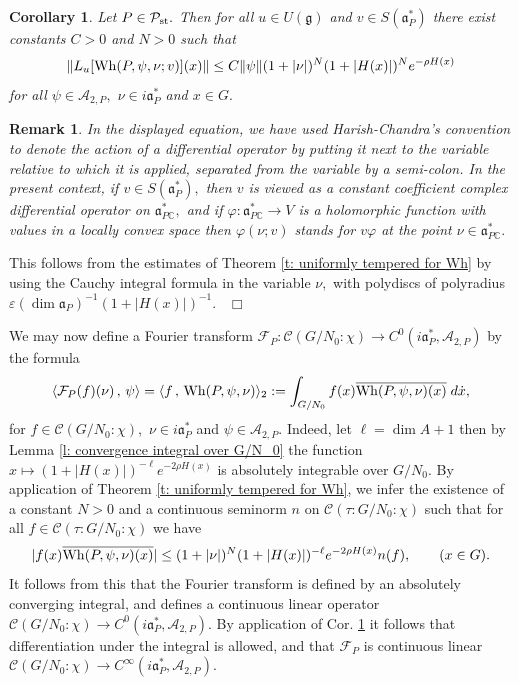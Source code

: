 \documentclass[12pt,a4paper]{article}
\newtheorem{Cor}[Thm]{Corollary}
\newtheorem{Rem}[Thm]{Remark}
\newenvironment{cor}[0]{\begin{Cor}\noindent}%
{\end{Cor}}
\newenvironment{rem}[0]{\begin{Rem}\noindent\rm}%
{\end{Rem}}
\def\proof{\par\noindent{\it Proof.}{\ }{\ }}
\def\qed{~\hfill\hbox{$\Box$}\medbreak}
\def\qquad{\quad\quad}
\def\msy#1{{\mathbb #1}}
\def\C{{\msy C}}
\def\ge{\varepsilon}
\def\gf{\varphi}
\def\got#1{\mathfrak #1}
\def\fa{{\got a}}
\def\fg{{\got g}}
\def\to{\rightarrow}
\def\inp#1#2{\langle#1\,,\,#2\rangle}
\def\iC{{\scriptscriptstyle \C}}
\def\cA{{\mathcal A}}
\def\cC{{\mathcal C}}
\def\cF{{\mathcal F}}
\def\cP{{\mathcal P}}
\numberwithin{Thm}{section}
\numberwithin{equation}{section}
\def\Wh{{\rm Wh}}
\def\faPdc{{\fa_{P\iC}^*}}
\def\faPd{{\fa_P^*}}
\numberwithin{equation}{section}
\def\faPdc{\fa_{P\iC}^*}
\def\faP{\fa_P}
\def\snorm{n}
\def\cAtwoP{\cA_{2,P}}
\def\col{\!:\!}
\def\cPst{\cP_{\rm st}}
\def\cchi{\chi}
\begin{document}
%


\begin{cor}
\label{c: estimate diff Wh}
Let $P \in \cPst.$ Then for all $u \in U(\fg)$ and $v \in S(\faPd)$ 
there exist constants $C > 0$ and $N>0$ such that
$$ 
\|L_u [\Wh(P, \psi, \nu; v)](x)\| \leq C\|\psi\| (1+ |\nu|)^N (1 + |H(x)|)^N e^{-\rho H(x)} 
$$%
for all $\psi \in \cAtwoP,$ $\nu \in i\faPd$ and $x \in G.$ 
\end{cor}

\begin{rem}
In the displayed equation, we have used Harish-Chandra's convention to denote the action
of a differential operator by putting it next to the variable relative to which it is applied, 
separated from the variable by a semi-colon.
 In the present context, if $v\in S(\faPd),$ then $v$ 
is viewed as a constant coefficient complex differential operator on $\faPdc,$ and 
if $\gf: \faPdc \to V$ is a holomorphic function with values in a locally convex space then 
$\gf(\nu ; v)$ stands for $v \gf$ at the point $\nu \in \faPdc.$ 
\end{rem} 

\proof 
This follows from the estimates of Theorem \ref{t: uniformly tempered for Wh} by using the Cauchy integral 
formula in the variable $\nu,$ with polydiscs of polyradius $\ge (\dim\faP)^{-1} (1 + |H(x)|)^{-1}.$ 
\qed

We may now define a Fourier transform $\cF_P: \cC(G/N_0\col \cchi) \to C^0(i\faPd, \cAtwoP)$ 
by the formula 
$$ 
\inp{\cF_P(f) (\nu)}{\psi} = \inp{f}{\Wh(P,\psi, \nu)}_2 := \int_{G/N_0} f(x) \overline{\Wh(P, \psi, \nu)(x)}\; d \dot{x},
$$%
for $f \in \cC(G/N_0\col\cchi),$ $\nu \in i\faPd$ and $\psi \in \cAtwoP.$ 
Indeed, let $\ell = \dim A + 1$ then by Lemma \ref{l: convergence integral over G/N_0}
the function
$x \mapsto (1+ |H(x)|)^{-\ell} e^{-2\rho H(x)}$ is absolutely integrable over $G/N_0.$ 
By application of Theorem \ref{t: uniformly tempered for Wh}, we infer the existence of a constant $N > 0$ 
and a continuous seminorm 
$\snorm$ on $\cC(\tau: G/N_0\col \cchi)$ such that for all $f \in \cC(\tau: G/N_0\col\cchi) $ we have
\begin{equation}
\label{e: first estimate Fourier}
|f(x) \overline{\Wh(P, \psi, \nu)(x)}| \leq  (1 +|\nu|)^N (1+ |H(x)|)^{-\ell} e^{-2\rho H(x)} \snorm(f),\qquad (x \in G).
\end{equation} 
It follows from this that the Fourier transform is defined by an absolutely converging integral, and defines a continuous linear operator $\cC(G/N_0\col\cchi) \to C^0(i\faPd, \cAtwoP).$ By application of Cor. \ref{c: estimate diff Wh} it follows that differentiation
under the integral is allowed, and that $\cF_P$ is continuous linear
$\cC(G/N_0\col\cchi) \to C^\infty(i \faPd, \cAtwoP).$ 
\end{document}
